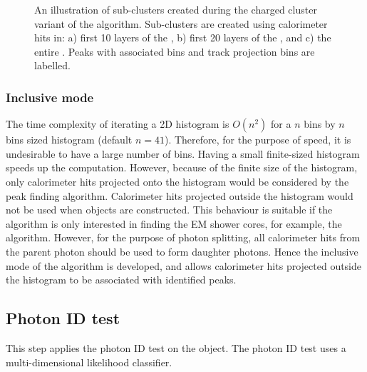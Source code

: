 \begin{figure}[tbph]
\begin{subfigure}[b]{0.65\textwidth}
    \caption{}
    \label{fig:photon2DpeakCharge3}
  \end{subfigure}
\caption
{An illustration of sub-clusters created during the charged cluster variant of the \peakFinding algorithm. Sub-clusters are created using calorimeter hits in: a) first 10 layers of the \ECAL, b) first 20 layers of the \ECAL, and c) the entire \ECAL. Peaks with associated bins and track projection bins are labelled.}
\label{fig:photon2DpeakCharge}
\end{figure}


\subsubsection{Inclusive mode}
\label{sec:photonPeakFindingInclusive}


The time complexity of iterating a 2D histogram is $O(n^2)$ for a $n$ bins by  $n$ bins sized histogram (default $n = 41$). Therefore, for the purpose of speed, it is undesirable to have  a large number of bins. Having a small finite-sized histogram speeds up the computation. However, because of the finite size of the histogram, only  calorimeter hits  projected onto the histogram would be considered by the peak finding algorithm. Calorimeter hits projected outside the histogram would not be used when \ShowerPeak objects are constructed. This behaviour is suitable if the algorithm is only interested in finding the EM shower cores, for example, the \PhotonReconstruction algorithm. However, for the purpose of photon splitting, all calorimeter hits from the parent photon should be used to form daughter photons. Hence the inclusive mode of the \peakFinding algorithm is developed, and allows calorimeter hits projected outside the histogram to be associated with identified peaks.



\subsection{Photon ID test}
\label{sec:photonIDtest}

This step applies the photon ID test on the \ShowerPeak object. The photon ID test uses  a multi-dimensional likelihood classifier.



